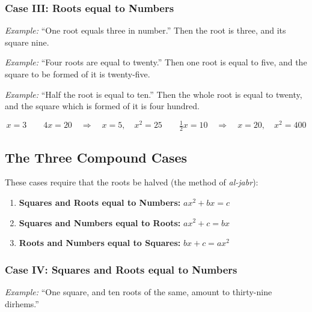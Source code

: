 \documentclass[11pt,a4paper]{book}
\begin{document}
\subsubsection*{Case III: Roots equal to Numbers}

\textit{Example:} ``One root equals three in number.'' Then the root is three,
and its square nine.

\textit{Example:} ``Four roots are equal to twenty.'' Then one root is equal to
five, and the square to be formed of it is twenty-five.

\textit{Example:} ``Half the root is equal to ten.'' Then the whole root is equal
to twenty, and the square which is formed of it is four hundred.

\begin{equation}
\boxed{x = 3}
\qquad
\boxed{4x = 20 \quad\Rightarrow\quad x = 5, \quad x^2 = 25}
\qquad
\boxed{\tfrac{1}{2}x = 10 \quad\Rightarrow\quad x = 20, \quad x^2 = 400}
\end{equation}

\subsection{The Three Compound Cases}

These cases require that the roots be halved (the method of \textit{al-jabr}):

\begin{mathbox}[title={\textbf{Compound Cases (require halving the roots)}}]
\begin{enumerate}[label=\textbf{Case \Roman*:},leftmargin=3em]
  \item[(IV)] \textbf{Squares and Roots equal to Numbers:}
  $ax^2 + bx = c$
  
  \item[(V)] \textbf{Squares and Numbers equal to Roots:}
  $ax^2 + c = bx$
  
  \item[(VI)] \textbf{Roots and Numbers equal to Squares:}
  $bx + c = ax^2$
\end{enumerate}
\end{mathbox}

\subsubsection*{Case IV: Squares and Roots equal to Numbers}

\textit{Example:} ``One square, and ten roots of the same, amount to
thirty-nine dirhems.''
\end{document}
